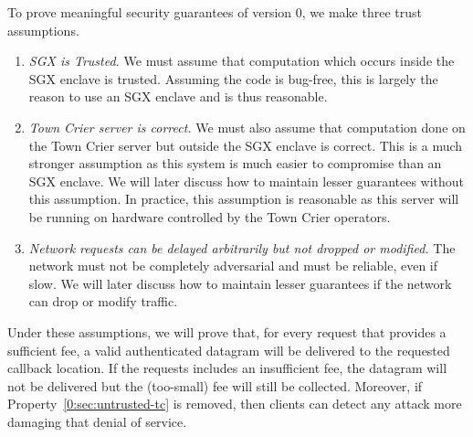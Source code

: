 To prove meaningful security guarantees of version 0, we make three trust assumptions.
\begin{enumerate}
  \item \label{0:sec:sgx}
    {\it SGX is Trusted.}
    We must assume that computation which occurs inside the SGX enclave is trusted.
    Assuming the code is bug-free, this is largely the reason to use an SGX enclave and is thus reasonable.

  \item \label{0:sec:untrusted-tc}
    {\it Town Crier server is correct.}
    We must also assume that computation done on the Town Crier server but outside the SGX enclave is correct.
    This is a much stronger assumption as this system is much easier to compromise than an SGX enclave.
    We will later discuss how to maintain lesser guarantees without this assumption.
    In practice, this assumption is reasonable as this server will be running on hardware controlled by the Town Crier operators.

  \item \label{0:sec:network}
    {\it Network requests can be delayed arbitrarily but not dropped or modified.}
    The network must not be completely adversarial and must be reliable, even if slow.
    We will later discuss how to maintain lesser guarantees if the network can drop or modify traffic.
\end{enumerate}
Under these assumptions, we will prove that, for every request that provides a sufficient fee,
a valid authenticated datagram will be delivered to the requested callback location.
If the requests includes an insufficient fee, the datagram will not be delivered but the (too-small) fee will still be collected.
Moreover, if Property~\ref{0:sec:untrusted-tc} is removed, then clients can detect any attack more damaging that denial of service.


